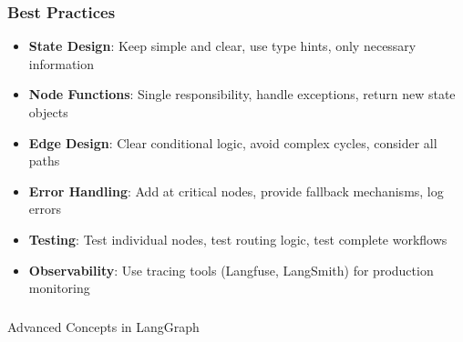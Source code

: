 \begin{frame}[fragile]\frametitle{Best Practices}
      \begin{itemize}
        \item \textbf{State Design}: Keep simple and clear, use type hints, only necessary information
        \item \textbf{Node Functions}: Single responsibility, handle exceptions, return new state objects
        \item \textbf{Edge Design}: Clear conditional logic, avoid complex cycles, consider all paths
        \item \textbf{Error Handling}: Add at critical nodes, provide fallback mechanisms, log errors
        \item \textbf{Testing}: Test individual nodes, test routing logic, test complete workflows
        \item \textbf{Observability}: Use tracing tools (Langfuse, LangSmith) for production monitoring
      \end{itemize}
\end{frame}

\begin{frame}[fragile]\frametitle{}
\begin{center}
{\Large Advanced Concepts in LangGraph}
\end{center}
\end{frame}


